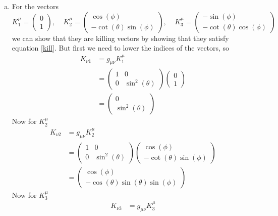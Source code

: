 \documentclass[11pt]{article}
\numberwithin{equation}{section}
\begin{document}
\begin{enumerate}[(a)]
\item
For the vectors 
$$K^{\mu}_1 = \left(\begin{array}{c}
		0\\ 1	\end{array}\right), \ \ \ \ \
K^{\mu}_2 = \left(\begin{array}{c}
		\cos(\phi)\\ -\cot(\theta)\sin(\phi)	\end{array}\right),\ \ \ \ \
K^{\mu}_3 = \left(\begin{array}{c}
		-\sin(\phi)\\ -\cot(\theta)\cos(\phi)	\end{array}\right)$$
we can show that they are killing vectors by showing that they satisfy equation \ref{kill}. But first we need to lower the indices of the vectors, so
\begin{align*}
K_{{\nu}1} &= g_{\mu\nu}K_1^{\mu}\\
&= \left(\begin{array}{cc}
	1	&0\\
	0	&\sin^2(\theta)
	\end{array}\right)
	\left(\begin{array}{c}
	0\\ 	1	\end{array}\right)\\
&= \left(\begin{array}{c}
	0\\	\sin^2(\theta)
	\end{array}\right)
\end{align*}
Now for $K^{\mu}_2$
\begin{align*}
K_{{\nu}2} &= g_{\mu\nu}K_2^{\mu}\\
&= \left(\begin{array}{cc}
	1	&0\\
	0	&\sin^2(\theta)
	\end{array}\right)
	\left(\begin{array}{c}
	\cos(\phi)\\ -\cot(\theta)\sin(\phi)	
	\end{array}\right)\\
&=	\left(\begin{array}{c}
	\cos(\phi)\\ -\cos(\theta)\sin(\theta)\sin(\phi)	
	\end{array}\right)
\end{align*}
Now for $K^{\mu}_3$
\begin{align*}
K_{{\nu}3} &= g_{\mu\nu}K_3^{\mu}\\

\end{align*}
\end{enumerate}
\end{document}
